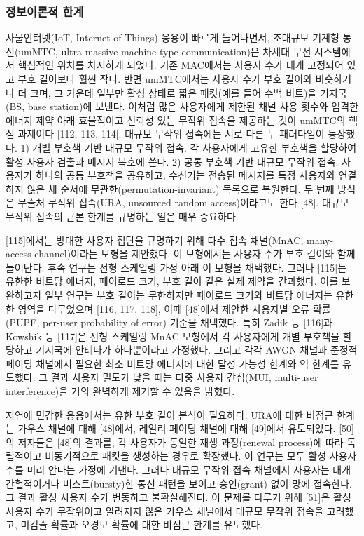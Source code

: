 \subsubsection{정보이론적 한계}

사물인터넷(IoT, Internet of Things) 응용이 빠르게 늘어나면서, 초대규모 기계형 통신(umMTC, ultra-massive machine-type communication)은 차세대 무선 시스템에서 핵심적인 위치를 차지하게 되었다. 기존 MAC에서는 사용자 수가 대개 고정되어 있고 부호 길이보다 훨씬 작다. 반면 umMTC에서는 사용자 수가 부호 길이와 비슷하거나 더 크며, 그 가운데 일부만 활성 상태로 짧은 패킷(예를 들어 수백 비트)을 기지국(BS, base station)에 보낸다. 이처럼 많은 사용자에게 제한된 채널 사용 횟수와 엄격한 에너지 제약 아래 효율적이고 신뢰성 있는 무작위 접속을 제공하는 것이 umMTC의 핵심 과제이다 [112, 113, 114]. 대규모 무작위 접속에는 서로 다른 두 패러다임이 등장했다. 1) 개별 부호책 기반 대규모 무작위 접속. 각 사용자에게 고유한 부호책을 할당하여 활성 사용자 검출과 메시지 복호에 쓴다. 2) 공통 부호책 기반 대규모 무작위 접속. 사용자가 하나의 공통 부호책을 공유하고, 수신기는 전송된 메시지를 특정 사용자와 연결하지 않은 채 순서에 무관한(permutation-invariant) 목록으로 복원한다. 두 번째 방식은 무출처 무작위 접속(URA, unsourced random access)이라고도 한다 [48]. 대규모 무작위 접속의 근본 한계를 규명하는 일은 매우 중요하다.

[115]에서는 방대한 사용자 집단을 규명하기 위해 다수 접속 채널(MnAC, many-access channel)이라는 모형을 제안했다. 이 모형에서는 사용자 수가 부호 길이와 함께 늘어난다. 후속 연구는 선형 스케일링 가정 아래 이 모형을 채택했다. 그러나 [115]는 유한한 비트당 에너지, 페이로드 크기, 부호 길이 같은 실제 제약을 간과했다. 이를 보완하고자 일부 연구는 부호 길이는 무한하지만 페이로드 크기와 비트당 에너지는 유한한 영역을 다루었으며 [116, 117, 118], 이때 [48]에서 제안한 사용자별 오류 확률(PUPE, per-user probability of error) 기준을 채택했다. 특히 Zadik 등 [116]과 Kowshik 등 [117]은 선형 스케일링 MnAC 모형에서 각 사용자에게 개별 부호책을 할당하고 기지국에 안테나가 하나뿐이라고 가정했다. 그리고 각각 AWGN 채널과 준정적 페이딩 채널에서 필요한 최소 비트당 에너지에 대한 달성 가능성 한계와 역 한계를 유도했다. 그 결과 사용자 밀도가 낮을 때는 다중 사용자 간섭(MUI, multi-user interference)을 거의 완벽하게 제거할 수 있음을 밝혔다.

지연에 민감한 응용에서는 유한 부호 길이 분석이 필요하다. URA에 대한 비점근 한계는 가우스 채널에 대해 [48]에서, 레일리 페이딩 채널에 대해 [49]에서 유도되었다. [50]의 저자들은 [48]의 결과를, 각 사용자가 동일한 재생 과정(renewal process)에 따라 독립적이고 비동기적으로 패킷을 생성하는 경우로 확장했다. 이 연구는 모두 활성 사용자 수를 미리 안다는 가정에 기댄다. 그러나 대규모 무작위 접속 채널에서 사용자는 대개 간헐적이거나 버스트(bursty)한 통신 패턴을 보이고 승인(grant) 없이 망에 접속한다. 그 결과 활성 사용자 수가 변동하고 불확실해진다. 이 문제를 다루기 위해 [51]은 활성 사용자 수가 무작위이고 알려지지 않은 가우스 채널에서 대규모 무작위 접속을 고려했고, 미검출 확률과 오경보 확률에 대한 비점근 한계를 유도했다.


